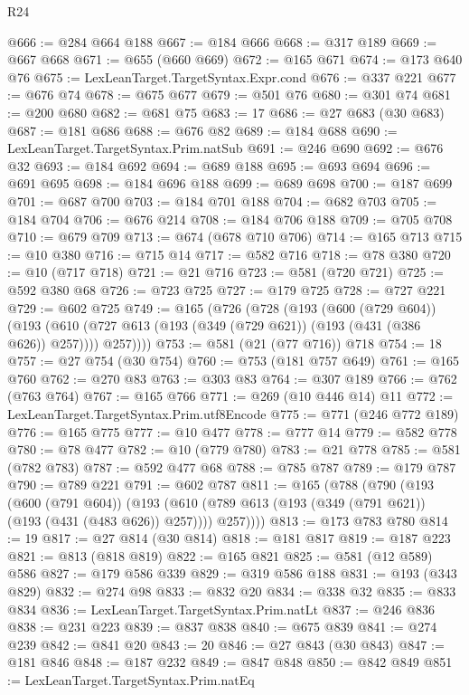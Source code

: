 \begin{lexlean}{R24}
\begin{coremodule}
@666 := @284 @664 @188
@667 := @184 @666
@668 := @317 @189
@669 := @667 @668
@671 := @655 (@660 @669)
@672 := @165 @671
@674 := @173 @640 @76
@675 := LexLeanTarget.TargetSyntax.Expr.cond
@676 := @337 @221
@677 := @676 @74
@678 := @675 @677
@679 := @501 @76
@680 := @301 @74
@681 := @200 @680
@682 := @681 @75
@683 := 17
@686 := @27 @683 (@30 @683)
@687 := @181 @686
@688 := @676 @82
@689 := @184 @688
@690 := LexLeanTarget.TargetSyntax.Prim.natSub
@691 := @246 @690
@692 := @676 @32
@693 := @184 @692
@694 := @689 @188
@695 := @693 @694
@696 := @691 @695
@698 := @184 @696 @188
@699 := @689 @698
@700 := @187 @699
@701 := @687 @700
@703 := @184 @701 @188
@704 := @682 @703
@705 := @184 @704
@706 := @676 @214
@708 := @184 @706 @188
@709 := @705 @708
@710 := @679 @709
@713 := @674 (@678 @710 @706)
@714 := @165 @713
@715 := @10 @380
@716 := @715 @14
@717 := @582 @716
@718 := @78 @380
@720 := @10 (@717 @718)
@721 := @21 @716
@723 := @581 (@720 @721)
@725 := @592 @380 @68
@726 := @723 @725
@727 := @179 @725
@728 := @727 @221
@729 := @602 @725
@749 := @165
    (@726
      (@728
        (@193
          (@600 (@729 @604))
          (@193 (@610 (@727 @613 (@193 (@349 (@729 @621)) (@193 (@431 (@386 @626)) @257)))) @257))))
@753 := @581 (@21 (@77 @716)) @718
@754 := 18
@757 := @27 @754 (@30 @754)
@760 := @753 (@181 @757 @649)
@761 := @165 @760
@762 := @270 @83
@763 := @303 @83
@764 := @307 @189
@766 := @762 (@763 @764)
@767 := @165 @766
@771 := @269 (@10 @446 @14) @11
@772 := LexLeanTarget.TargetSyntax.Prim.utf8Encode
@775 := @771 (@246 @772 @189)
@776 := @165 @775
@777 := @10 @477
@778 := @777 @14
@779 := @582 @778
@780 := @78 @477
@782 := @10 (@779 @780)
@783 := @21 @778
@785 := @581 (@782 @783)
@787 := @592 @477 @68
@788 := @785 @787
@789 := @179 @787
@790 := @789 @221
@791 := @602 @787
@811 := @165
    (@788
      (@790
        (@193
          (@600 (@791 @604))
          (@193 (@610 (@789 @613 (@193 (@349 (@791 @621)) (@193 (@431 (@483 @626)) @257)))) @257))))
@813 := @173 @783 @780
@814 := 19
@817 := @27 @814 (@30 @814)
@818 := @181 @817
@819 := @187 @223
@821 := @813 (@818 @819)
@822 := @165 @821
@825 := @581 (@12 @589) @586
@827 := @179 @586 @339
@829 := @319 @586 @188
@831 := @193 (@343 @829)
@832 := @274 @98
@833 := @832 @20
@834 := @338 @32
@835 := @833 @834
@836 := LexLeanTarget.TargetSyntax.Prim.natLt
@837 := @246 @836
@838 := @231 @223
@839 := @837 @838
@840 := @675 @839
@841 := @274 @239
@842 := @841 @20
@843 := 20
@846 := @27 @843 (@30 @843)
@847 := @181 @846
@848 := @187 @232
@849 := @847 @848
@850 := @842 @849
@851 := LexLeanTarget.TargetSyntax.Prim.natEq

\end{coremodule}
\end{lexlean}
